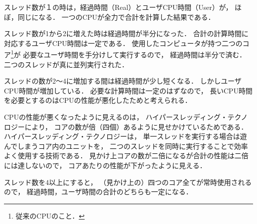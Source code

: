 スレッド数が１の時は，経過時間（Real）とユーザCPU時間（User）が，
ほぼ，同じになる．
一つのCPUが全力で合計を計算した結果である．

スレッド数が1から2に増えた時は経過時間が半分になった．
合計の計算時間に対応するユーザCPU時間は一定である．
使用したコンピュータが持つ二つのコア\footnote{従来のCPUのこと．}が
必要なユーザ時間を手分けして実行するので，
経過時間は半分で済む．
二つのスレッドが真に並列実行された．

スレッドの数が2〜4に増加する間は経過時間が少し短くなる．
しかしユーザCPU時間が増加している．
必要な計算時間は一定のはずなので，
長いCPU時間を必要とするのはCPUの性能が悪化したためと考えられる．

CPUの性能が悪くなったように見えるのは，
ハイパースレッディング・テクノロジー\cite{hyperThreading}により，
コアの数が倍（四個）あるように見せかけているためである．
ハイパースレッディング・テクノロジーは，
単一スレッドを実行する場合は遊んでしまうコア内のユニットを，
二つのスレッドを同時に実行することで効率よく使用する技術である．
見かけ上コアの数が二倍になるが合計の性能は二倍には達しないので，
コアあたりの性能が下がったように見える．

スレッド数を4以上にすると，
（見かけ上の）四つのコア全てが常時使用されるので，
経過時間，ユーザ時間の合計のどちらも一定になる．

